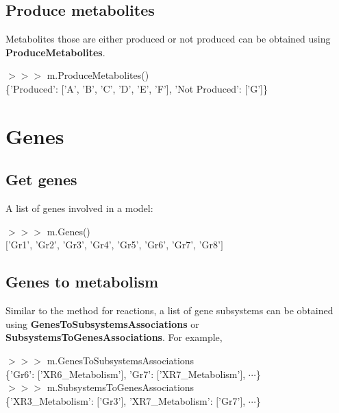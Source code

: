 
\subsection{Produce metabolites}

Metabolites those are either produced or not produced can be obtained using \textbf{ProduceMetabolites}.

\begin{framed}
$>>>$ m.ProduceMetabolites()\\
\{'Produced': ['A', 'B', 'C', 'D', 'E', 'F'], 'Not Produced': ['G']\}
\end{framed}


\section{Genes}

\subsection{Get genes}

A list of genes involved in a model:

\begin{framed}
$>>>$ m.Genes()\\
$[$'Gr1', 'Gr2', 'Gr3', 'Gr4', 'Gr5', 'Gr6', 'Gr7', 'Gr8'$]$
\end{framed}


\subsection{Genes to metabolism}

Similar to the method for reactions, a list of gene subsystems can be obtained using \textbf{GenesToSubsystemsAssociations} or \textbf{SubsystemsToGenesAssociations}. For example,

\begin{framed}
$>>>$ m.GenesToSubsystemsAssociations\\
\{'Gr6': $[$'XR6\_Metabolism'$]$, 'Gr7': $[$'XR7\_Metabolism'], $\cdots$\}\\

$>>>$ m.SubsystemsToGenesAssociations\\
\{'XR3\_Metabolism': $[$'Gr3'$]$, 'XR7\_Metabolism': $[$'Gr7'$]$, $\cdots$\}
\end{framed}

